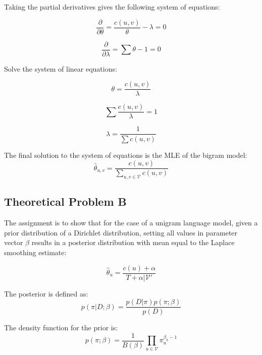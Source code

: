 Taking the partial derivatives gives the following system of equations:

\begin{equation*}
    \frac{\partial}{\partial \theta} = \frac{c(u,v)}{\theta} - \lambda = 0
\end{equation*}

\begin{equation*}
    \frac{\partial}{\partial \lambda} = \sum \theta - 1 = 0
\end{equation*}

Solve the system of linear equations:

\begin{equation*}
    \theta = \frac{c(u,v)}{\lambda}
\end{equation*}

\begin{equation*}
    \sum \frac{c(u,v)}{\lambda} = 1
\end{equation*}

\begin{equation*}
    \lambda = \frac{1}{\sum c(u,v)}
\end{equation*}

The final solution to the system of equations is the MLE of the bigram model:
\begin{equation*}
    {\hat \theta_{u,v}} = \frac{c(u,v)}{\sum_{u,v\in \mathcal{V}}c(u,v)}
\end{equation*}

\subsection*{Theoretical Problem B}

The assignment is to show that for the case of a unigram language model, given a prior distribution of a Dirichlet distribution, setting all values in parameter vector $\beta$ results in a posterior distribution with mean equal to the Laplace smoothing estimate:

\begin{equation*}
    \hat{\theta}_u = \frac{c(u) + \alpha}{T + \alpha|\mathcal{V}'}
\end{equation*}

The posterior is defined as:
\begin{equation*}
    p(\pi|D;\beta) = \frac{p(D|\pi)p(\pi;\beta)}{p(D)}
\end{equation*}

The density function for the prior is:
\begin{equation*}
    p(\pi;\beta) = \frac{1}{B(\beta)}\prod_{u \in \mathcal{V}}\pi_u^{\beta_u - 1}
\end{equation*}

